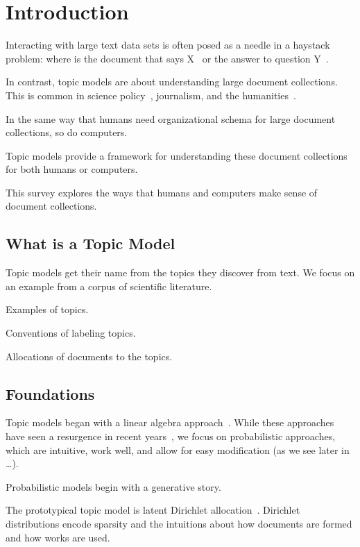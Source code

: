
\chapter{Introduction}
\label{ch:intro}

Interacting with large text data sets is often posed as a needle in a
haystack problem: where is the document that says X~\citep{Salton-68} or the answer to
question Y~\citep{Hirschman-01}.

In contrast, topic models are about understanding large document
collections.  This is common in science policy~\citep{talley-11}, journalism, and the
humanities~\citep{moretti-13}.

In the same way that humans need organizational schema for large
document collections, so do computers.

Topic models provide a framework for understanding these document
collections for both humans or computers.

This survey explores the ways that humans and computers make sense of
document collections.

\section{What is a Topic Model}

Topic models get their name from the topics they discover from text.
We focus on an example from a corpus of scientific literature.

Examples of topics.

Conventions of labeling topics.

Allocations of documents to the topics.

\section{Foundations}

Topic models began with a linear algebra
approach~\citep{deerwester-90}.  While these approaches have seen a
resurgence in recent years~\citep{anandkumar-12:lda,arora-13}, we focus
on probabilistic approaches, which are intuitive, work well, and allow
for easy modification (as we see later in \dots).

Probabilistic models begin with a generative story.

The prototypical topic model is latent Dirichlet
allocation~\citep{blei-03}.  Dirichlet distributions encode sparsity
and the intuitions about how documents are formed and how works are
used.

